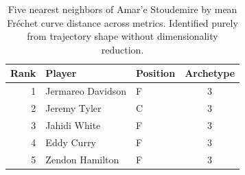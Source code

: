 \begin{table}[htbp]
  \centering\small
  \begin{tabular}{rllc}
    \toprule
    Rank & Player & Position & Archetype \\
    \midrule
    1 & Jermareo Davidson & F & 3 \\
    2 & Jeremy Tyler & C & 3 \\
    3 & Jahidi White & F & 3 \\
    4 & Eddy Curry & F & 3 \\
    5 & Zendon Hamilton & F & 3 \\
    \bottomrule
  \end{tabular}
  \caption{Five nearest neighbors of Amar'e Stoudemire by mean Fr\'{e}chet curve distance across metrics. Identified purely from trajectory shape without dimensionality reduction.}
  \label{tab:Amar_e_Stoudemire_frechet_curve_neighbors}
\end{table}

